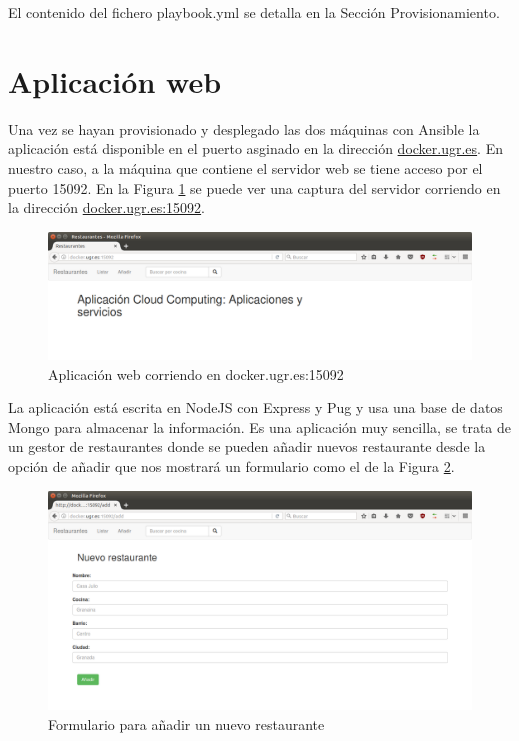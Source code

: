 El contenido del fichero playbook.yml se detalla en la Sección Provisionamiento. \\

\section{Aplicación web}

Una vez se hayan provisionado y desplegado las dos máquinas con Ansible la aplicación está disponible en el puerto asginado en la dirección \url{docker.ugr.es}. En nuestro caso, a la máquina que contiene el servidor web se tiene acceso por el puerto 15092. En la Figura \ref{fig:app} se puede ver una captura del servidor corriendo en la dirección \url{docker.ugr.es:15092}. \\

\begin{figure}[h!]
	\centering
	\includegraphics[width=13cm]{./images/app}
	\caption{Aplicación web corriendo en docker.ugr.es:15092} 
	\label{fig:app}
\end{figure}

La aplicación está escrita en NodeJS con Express y Pug y usa una base de datos Mongo para almacenar la información. Es una aplicación muy sencilla, se trata de un gestor de restaurantes donde se pueden añadir nuevos restaurante desde la opción de añadir que nos mostrará un formulario como el de la Figura \ref{fig:nuevo}. \\

\begin{figure}[h!]
	\centering
	\includegraphics[width=13cm]{./images/nuevo}
	\caption{Formulario para añadir un nuevo restaurante} 
	\label{fig:nuevo}
\end{figure}

